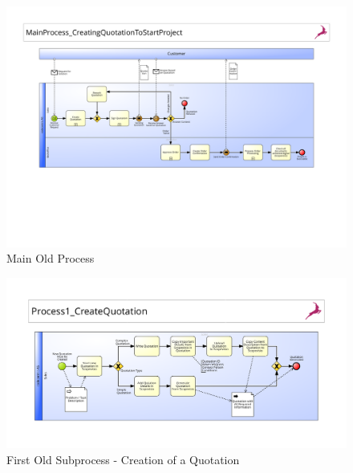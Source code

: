 \begin{figure}[h]
	\begin{center}
		\includegraphics[width=\textheight,angle=90]{./appendix/pbmnOld/0_main.pdf}
		\caption{Main Old Process}\label{fig:0_main}
	\end{center}
\end{figure} 

\begin{figure}[h]
	\begin{center}
		\includegraphics[width=\textheight,angle=90]{./appendix/pbmnOld/0-1_createQuote.pdf}
		\caption{First Old Subprocess - Creation of a Quotation}\label{fig:0-1_sub}
	\end{center}
\end{figure} 

